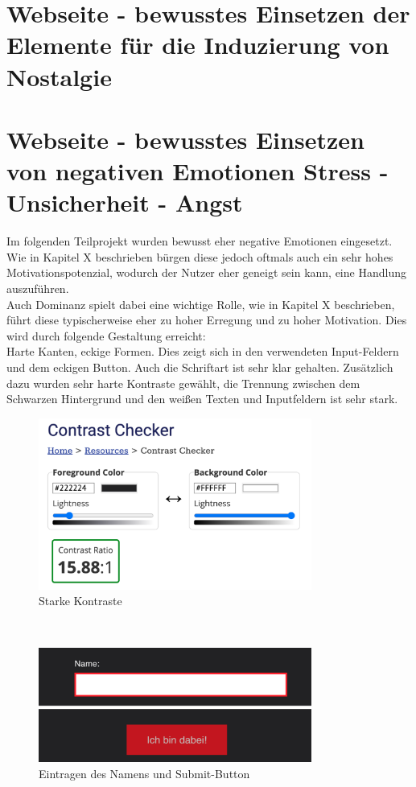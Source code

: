\documentclass[./dokumentation.tex]{subfiles}
\begin{document}
\pagebreak
\section{Webseite - bewusstes Einsetzen der Elemente für die Induzierung von Nostalgie}


\pagebreak
\section{Webseite - bewusstes Einsetzen von negativen Emotionen Stress - Unsicherheit - Angst}
Im folgenden Teilprojekt wurden bewusst eher negative Emotionen eingesetzt. Wie in Kapitel X beschrieben bürgen diese jedoch oftmals auch ein sehr hohes Motivationspotenzial, wodurch der Nutzer eher geneigt sein kann, eine Handlung auszuführen.\\
Auch Dominanz spielt dabei eine wichtige Rolle, wie in Kapitel X beschrieben, führt diese typischerweise eher zu hoher Erregung und zu hoher Motivation. Dies wird durch folgende Gestaltung erreicht:\\
Harte Kanten, eckige Formen. Dies zeigt sich in den verwendeten Input-Feldern und dem eckigen Button. Auch die Schriftart ist sehr klar gehalten. Zusätzlich dazu wurden sehr harte Kontraste gewählt, die Trennung zwischen dem Schwarzen Hintergrund und den weißen Texten und Inputfeldern ist sehr stark.

\begin{figure}[h]
    \centering
    \includegraphics[width=0.8\textwidth]{bilder/contrast.png}
    \caption{Starke Kontraste} %
    \label{fig12:contrast}
\end{figure}\\

\begin{figure}[h]
    \centering
    \includegraphics[width=0.8\textwidth]{bilder/name-bin-dabei.png}
    \caption{Eintragen des Namens und Submit-Button} %
    \label{fig13:name}
\end{figure}\\
\end{document}
